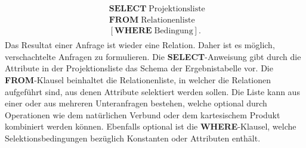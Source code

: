 \begin{align}
    \label{anf:stand}
    \begin{split}
    & \mathbf{SELECT} \; \text{Projektionsliste }\\
    & \mathbf{FROM} \; \text{Relationenliste } \\
    & [\mathbf{WHERE} \; \text{Bedingung}].
\end{split}
\end{align}
Das Resultat einer Anfrage ist wieder eine Relation. Daher ist es möglich, verschachtelte Anfragen zu formulieren. Die \textbf{SELECT}-Anweisung gibt durch die Attribute in der Projektionsliste das Schema der Ergebnistabelle vor. Die \textbf{FROM}-Klausel beinhaltet die Relationenliste, in welcher die Relationen aufgeführt sind, aus denen Attribute selektiert werden sollen. Die Liste kann aus einer oder aus mehreren Unteranfragen bestehen, welche optional durch Operationen wie dem natürlichen Verbund oder dem kartesischem Produkt kombiniert werden können. Ebenfalls optional ist die \textbf{WHERE}-Klausel, welche Selektionsbedingungen bezüglich Konstanten oder Attributen enthält. 

